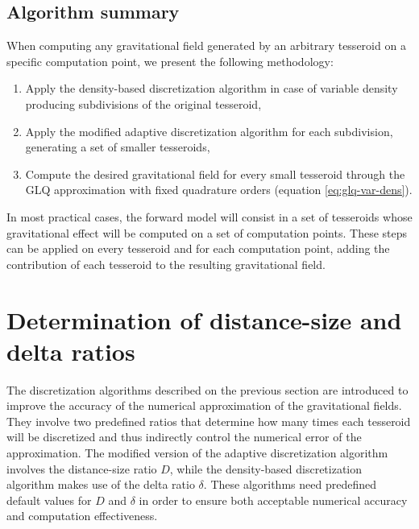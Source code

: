 \documentclass[extra]{gji}
\begin{document}
\subsection{Algorithm summary}

When computing any gravitational field generated by an arbitrary tesseroid on 
a specific computation point, we present the following methodology:

\begin{enumerate}
    \renewcommand{\theenumi}{(\arabic{enumi})}
    \item Apply the density-based discretization algorithm in case of 
          variable density producing subdivisions of the original tesseroid,
    \item Apply the modified adaptive discretization algorithm for 
          each subdivision, generating a set of smaller tesseroids,
    \item Compute the desired gravitational field for every small tesseroid 
          through the GLQ approximation with fixed quadrature orders
          (equation \ref{eq:glq-var-dens}).
\end{enumerate}

In most practical cases, the forward model will consist in a set of 
tesseroids whose gravitational effect will be computed on a set of 
computation points.
These steps can be applied on every tesseroid and for each computation point,
adding the contribution of each tesseroid to the resulting 
gravitational field.



\section{Determination of distance-size and delta ratios}

The discretization algorithms described on the previous section are 
introduced to improve the accuracy of the numerical approximation of 
the gravitational fields.
They involve two predefined ratios that determine how many 
times each tesseroid will be discretized and thus indirectly control 
the numerical error of the approximation.
The modified version of the adaptive discretization algorithm involves  
the distance-size ratio $D$, while the density-based discretization 
algorithm makes use of the delta ratio $\delta$.
These algorithms need predefined default values for $D$ and $\delta$ 
in order to ensure both acceptable numerical accuracy and computation 
effectiveness.
\end{document}

